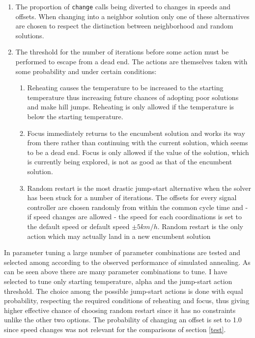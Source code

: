 \begin{enumerate}
\item The proportion of \verb|change| calls being diverted to changes in speeds and offsets. When changing into a neighbor solution only one of these alternatives are chosen to respect the distinction between neighborhood and random solutions.
\item The threshold for the number of iterations before some action must be performed to escape from a dead end. The actions are themselves taken with some probability and under certain conditions:
\begin{enumerate}
\item Reheating causes the temperature to be increased to the starting temperature thus increasing future chances of adopting poor solutions and make hill jumps. Reheating is only allowed if the temperature is below the starting temperature.
\item Focus immediately returns to the encumbent solution and works its way from there rather than continuing with the current solution, which seems to be a dead end. Focus is only allowed if the value of the solution, which is currently being explored, is not as good as that of the encumbent solution.
\item Random restart is the most drastic jump-start alternative when the solver has been stuck for a number of iterations. The offsets for every signal controller are chosen randomly from within the common cycle time and - if speed changes are allowed - the speed for each coordinations is set to the default speed or default speed $\pm 5km/h$. Random restart is the only action which may actually land in a new encumbent solution
\end{enumerate}
\end{enumerate}

In parameter tuning a large number of parameter combinations are tested and selected among according to the observed performance of simulated annealing. As can be seen above there are many parameter combinations to tune. I have selected to tune only starting temperature, alpha and the jump-start action threshold. The choice among the possible jump-start actions is done with equal probability, respecting the required conditions of reheating and focus, thus giving higher effective chance of choosing random restart since it has no constraints unlike the other two options. The probability of changing an offset is set to 1.0 since speed changes was not relevant for the comparisons of section \ref{test}.

